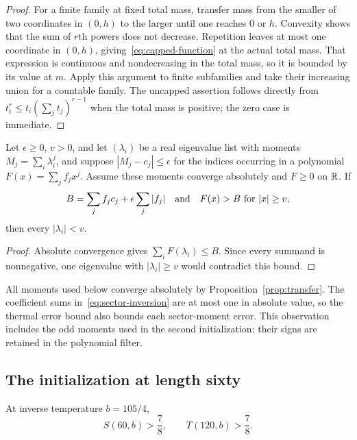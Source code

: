 \begin{proof}
For a finite family at fixed total mass, transfer mass from the smaller of two
coordinates in $(0,h)$ to the larger until one reaches $0$ or $h$.  Convexity
shows that the sum of $r$th powers does not decrease.  Repetition leaves at most
one coordinate in $(0,h)$, giving~\eqref{eq:capped-function} at the actual
total mass.  That expression is continuous and nondecreasing in the total
mass, so it is bounded by its value at $m$.  Apply this argument to finite
subfamilies and take their increasing union for a countable family.  The
uncapped assertion follows directly from
$t_i^r\le t_i(\sum_jt_j)^{r-1}$ when the total mass is positive; the zero case
is immediate.
\end{proof}

\begin{lemma}\label{lem:polynomial-filter}
Let $\epsilon\ge0$, $v>0$, and let $(\lambda_i)$ be a real eigenvalue list with moments
$M_j=\sum_i\lambda_i^j$, and suppose $|M_j-c_j|\le\epsilon$ for the
indices occurring in a polynomial $F(x)=\sum_j f_jx^j$.
Assume these moments converge absolutely and $F\ge0$ on $\mathbb R$.
If
\[
 B=\sum_j f_jc_j+\epsilon\sum_j|f_j|
 \quad\hbox{and}\quad F(x)>B\ \hbox{for }|x|\ge v,
\]
then every $|\lambda_i|<v$.
\end{lemma}

\begin{proof}
Absolute convergence gives $\sum_iF(\lambda_i)\le B$.  Since every summand
is nonnegative, one eigenvalue with $|\lambda_i|\ge v$ would contradict this
bound.
\end{proof}

All moments used below converge absolutely by Proposition~\ref{prop:transfer}.
The coefficient sums in~\eqref{eq:sector-inversion} are at most one in
absolute value, so the thermal error bound also bounds each sector-moment
error.  This observation includes the odd moments used in the second
initialization; their signs are retained in the polynomial filter.

\subsection{The initialization at length sixty}

\begin{proposition}\label{prop:seed60}
At inverse temperature $b=105/4$,
\[
 S(60,b)>\frac78,\qquad T(120,b)>\frac78.
\]
\end{proposition}

